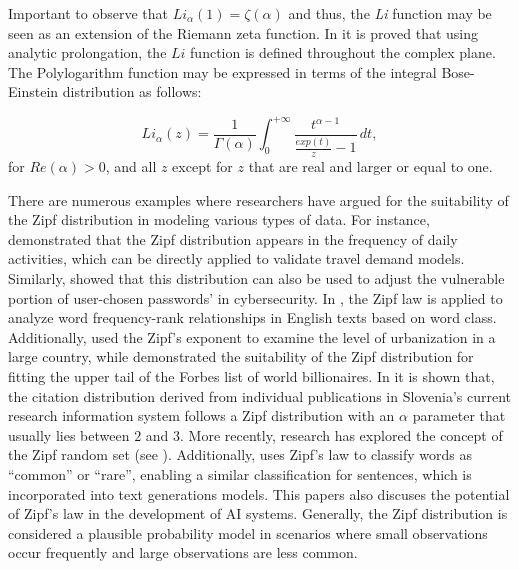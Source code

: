 \documentclass{article}
\begin{document}
\noindent Important to observe that $Li_{\alpha}(1) = \zeta(\alpha)$ and thus, the \textit{Li} function may be seen as an extension of the Riemann zeta function. In \cite{valero2022zipf} it is proved that using  analytic prolongation, the $Li$ function is defined throughout the complex plane. The Polylogarithm function may be expressed in terms of the integral Bose-Einstein distribution as follows:

\begin{equation} \label{eq:polylogexpression}
 Li_{\alpha} (z)=\frac{1}{\Gamma (\alpha)} \int_0^{+\infty}   \frac{t^{\alpha-1}}{\frac{exp(t)}{z}-1}\, dt,
\end{equation}
for $Re(\alpha)>0$, and all $z$ except for $z$ that are real and larger or equal to one.

There are numerous examples where researchers have argued for the suitability of the Zipf distribution in modeling various types of data. For instance, \cite{ectors2018exploratory} demonstrated that the Zipf distribution appears in the frequency of daily activities, which can be directly applied to validate travel demand models. Similarly, \cite{wang2017zipf} showed that this distribution can also be used to adjust the vulnerable portion of user-chosen passwords' in cybersecurity. In \cite{chacoma2021word}, the Zipf law is applied to analyze word frequency-rank relationships in English texts based on word class. Additionally, \cite{chen2021exploring} used the Zipf’s exponent to examine the level of urbanization in a large country, while \cite{asif2021statistical} demonstrated the suitability of the Zipf distribution for fitting the upper tail of the Forbes list of world billionaires. In \cite{perc2010zipf} it is shown that, the citation distribution derived from individual publications in Slovenia's current research information system follows a Zipf distribution with an $\alpha$ parameter that usually lies between $2$ and $3$. More recently, research has explored the concept of the Zipf random set (see \cite{lifshits2022two, lifshits2023probabilistic, lifshts2024intersections}).  Additionally, \cite{wang2023zipf} uses Zipf's law to classify words as ``common'' or ``rare'', enabling a similar classification for sentences, which is incorporated into text generations models. This papers also discuses the potential of Zipf's law in the development of AI systems. Generally, the Zipf distribution is considered a plausible probability model in scenarios where small observations occur frequently and large observations are less common. 
\end{document}
